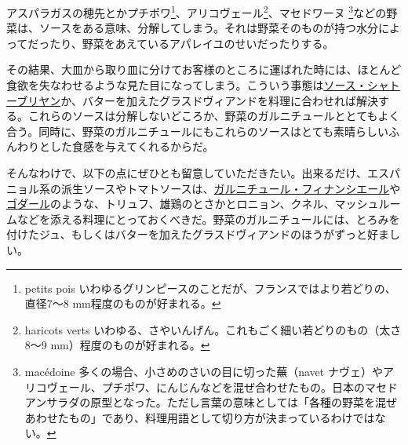 \begin{main}
アスパラガスの穂先とかプチポワ\footnote{petits pois
  いわゆるグリンピースのことだが、フランスではより若どりの、直径7〜8
  mm程度のものが好まれる。}、アリコヴェール\footnote{haricots verts
  いわゆる、さやいんげん。これもごく細い若どりのもの（太さ8〜9
  mm）程度のものが好まれる。}、マセドワーヌ \footnote{macédoine
  多くの場合、小さめのさいの目に切った蕪（navet
  ナヴェ）やアリコヴェール、プチポワ、にんじんなどを混ぜ合わせたもの。日本のマセドアンサラダの原型となった。ただし言葉の意味としては「各種の野菜を混ぜあわせたもの」であり、料理用語として切り方が決まっているわけではない。}などの野菜は、ソースをある意味、分解してしまう。それは野菜そのものが持つ水分によってだったり、野菜をあえているアパレイユのせいだったりする。

その結果、大皿から取り皿に分けてお客様のところに運ばれた時には、ほとんど食欲を失なわせるような見た目になってしまう。こういう事態は\protect\hyperlink{sauce-chateaubriand}{ソース・シャトーブリヤン}か、バターを加えたグラスドヴィアンドを料理に合わせれば解決する。これらのソースは分解しないどころか、野菜のガルニチュールととてもよく合う。同時に、野菜のガルニチュールにもこれらのソースはとても素晴らしいふんわりとした食感を与えてくれるからだ。

そんなわけで、以下の点にぜひとも留意していただきたい。出来るだけ、エスパニョル系の派生ソースやトマトソースは、\protect\hyperlink{garniture-financiere}{ガルニチュール・フィナンシエール}や\protect\hyperlink{garniture-godard}{ゴダール}のような、トリュフ、雄鶏のとさかとロニョン、クネル、マッシュルームなどを添える料理にとっておくべきだ。野菜のガルニチュールには、とろみを付けたジュ、もしくはバターを加えたグラスドヴィアンドのほうがずっと好ましい。

\end{main}
